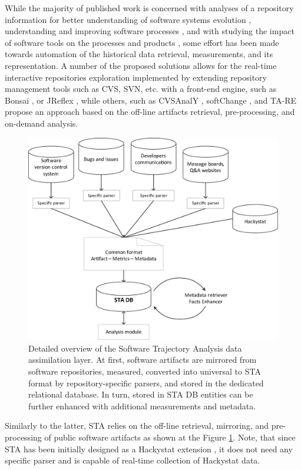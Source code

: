 While the majority of published work is concerned with analyses of a repository information 
for better understanding of software systems evolution \cite{citeulike:277045} \cite{citeulike:4000311}, 
understanding and improving software processes \cite{citeulike:5803126}, 
and with studying the impact of software tools on the processes and products \cite{citeulike:13125389},
some effort has been made towards automation of the historical data retrieval, measurements, and its representation. 
A number of the proposed solutions allows for the real-time interactive repositories exploration implemented by extending 
repository management tools such as CVS, SVN, etc. with a front-end engine, such as Bonsai \cite{bonsai},
or JReflex \cite{citeulike:3017440}, while others, such as CVSAnalY \cite{citeulike:6544724}, 
softChange \cite{citeulike:13125395}, and {TA}-{RE} \cite{citeulike:4000311} propose an approach based on 
the off-line artifacts retrieval, pre-processing, and on-demand analysis.

\begin{figure}[t]
   \centering
   \includegraphics[width=115mm]{figures/Flow.eps}
   \caption{Detailed overview of the Software Trajectory Analysis data assimilation layer. 
    At first, software artifacts are mirrored from software repositories, measured, converted into 
    universal to STA format by repository-specific parsers, and stored in the dedicated relational database.
    In turn, stored in STA DB entities can be further enhanced with additional measurements and metadata.}
   \label{fig:sta-assimilation}
\end{figure}

Similarly to the latter, STA relies on the off-line retrieval, mirroring, and pre-processing of public software artifacts as
shown at the Figure \ref{fig:sta-assimilation}. Note, that since STA has been initially designed as a Hackystat extension 
\cite{csdl2-10-09}, it does not need any specific parser and is capable of real-time collection of Hackystat data.

